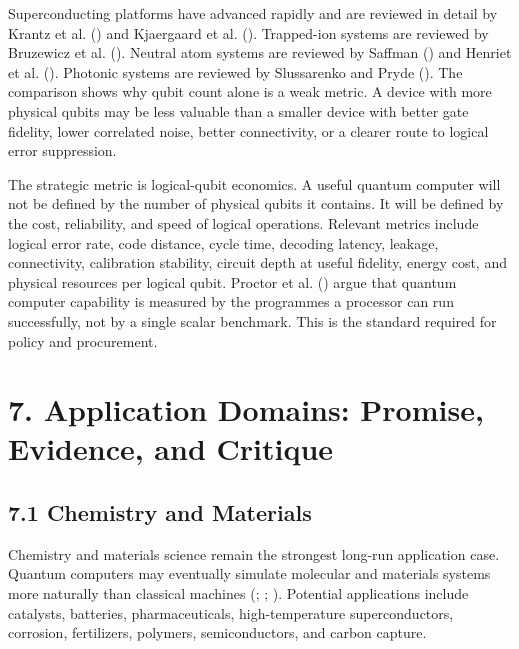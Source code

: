 \documentclass[
  11pt,
  letterpaper,
]{article}
\begin{document}
Superconducting platforms have advanced rapidly and are reviewed in
detail by Krantz et al. () and Kjaergaard
et al. (). Trapped-ion systems are
reviewed by Bruzewicz et al. ().
Neutral atom systems are reviewed by Saffman
() and Henriet et al.
(). Photonic systems are reviewed by
Slussarenko and Pryde (). The
comparison shows why qubit count alone is a weak metric. A device with
more physical qubits may be less valuable than a smaller device with
better gate fidelity, lower correlated noise, better connectivity, or a
clearer route to logical error suppression.

The strategic metric is logical-qubit economics. A useful quantum
computer will not be defined by the number of physical qubits it
contains. It will be defined by the cost, reliability, and speed of
logical operations. Relevant metrics include logical error rate, code
distance, cycle time, decoding latency, leakage, connectivity,
calibration stability, circuit depth at useful fidelity, energy cost,
and physical resources per logical qubit. Proctor et al.
() argue that quantum computer
capability is measured by the programmes a processor can run
successfully, not by a single scalar benchmark. This is the standard
required for policy and procurement.

\section{7. Application Domains: Promise, Evidence, and
Critique}\label{application-domains-promise-evidence-and-critique}

\subsection{7.1 Chemistry and Materials}\label{chemistry-and-materials}

Chemistry and materials science remain the strongest long-run
application case. Quantum computers may eventually simulate molecular
and materials systems more naturally than classical machines
(;
; ). Potential applications include catalysts, batteries,
pharmaceuticals, high-temperature superconductors, corrosion,
fertilizers, polymers, semiconductors, and carbon capture.
\end{document}
